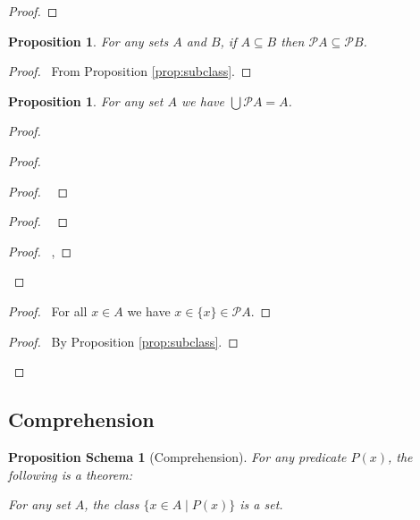 \documentclass{book}
\let\qed\relax
\newtheorem{prop}[ax]{Proposition}
\newtheorem{props}[ax]{Proposition Schema}
\theoremstyle{definition}
\begin{document}
\begin{proof}
	\pf
	\qed
\end{proof}

\begin{prop}
\label{prop:powermonotone}
For any sets $A$ and $B$, if $A \subseteq B$ then $\mathcal{P} A \subseteq \mathcal{P} B$.
\end{prop}

\begin{proof}
\pf\ From Proposition \ref{prop:subclass}. \qed
\end{proof}

\begin{prop}
\label{prop:UPA}
For any set $A$ we have $\bigcup \mathcal{P} A = A$.
\end{prop}

\begin{proof}
\pf
{}
\begin{proof}
	\begin{proof}
		\pf\ 
	\end{proof}
	\begin{proof}
		\pf\ 
	\end{proof}
	\begin{proof}
		\pf\ , 
	\end{proof}
\end{proof}
\begin{proof}
	\pf\ For all $x \in A$ we have $x \in \{x\} \in \mathcal{P} A$.
\end{proof}
\qedstep
\begin{proof}
	\pf\ By Proposition \ref{prop:subclass}.
\end{proof}
\qed
\end{proof}

\subsection{Comprehension}

\begin{props}[Comprehension]
For any predicate $P(x)$, the following is a theorem:

For any set $A$, the class $\{x \in A \mid P(x)\}$ is a set.
\end{props}
\end{document}
